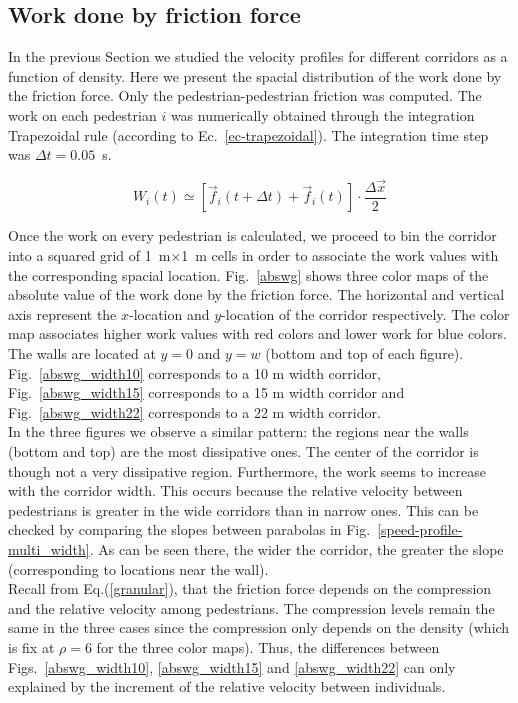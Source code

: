\subsection{Work done by friction force}

In the previous Section we studied the velocity profiles for different corridors as a function of density. Here we present the spacial distribution of the work done by the friction force. Only the pedestrian-pedestrian friction was computed.
{ \color{red} The work on each pedestrian $i$ was numerically obtained through the integration Trapezoidal rule (according to Ec.~\ref{ec-trapezoidal}). The integration time step was $\Delta t = 0.05$~s}. 

\begin{equation}
W_i(t) \simeq \left [ \vec{f}_i(t+\Delta t) + \vec{f}_i(t)  \right ]\cdot \frac{\Delta \vec{x}}{2} \label{ec-trapezoidal}
\end{equation}

Once the work on every pedestrian is calculated, we proceed to bin the corridor into a squared grid of 1~m$\times$1~m cells in order to associate the work values with the corresponding spacial location. Fig.~\ref{abswg} shows three color maps of the absolute value of the work done by the friction force. The horizontal and vertical axis represent the $x$-location and $y$-location of the corridor respectively. The color map associates higher work values with red colors and lower work for blue colors. The walls are located at $y=0$ and $y=w$ (bottom and top of each figure). Fig.~\ref{abswg_width10} corresponds to a 10 m width corridor, Fig.~\ref{abswg_width15} corresponds to a 15 m width corridor and Fig.~\ref{abswg_width22} corresponds to a 22 m width corridor.\\

In the three figures we observe a similar pattern: the regions near the walls (bottom and top) are the most dissipative ones. The center of the corridor is though not a very dissipative region. Furthermore, the work seems to increase with the corridor width. This occurs because the relative velocity between pedestrians is greater in the wide corridors than in narrow ones. This can be checked by comparing the slopes between parabolas in Fig.~\ref{speed-profile-multi_width}. As can be seen there, the wider the corridor, the greater the slope (corresponding to locations near the wall).\\

Recall from Eq.(\ref{granular}), that the friction force depends on the compression and the relative velocity among pedestrians. The compression levels remain the same in the three cases since the compression only depends on the density (which is fix at $\rho=6$ for the three color maps). Thus, the differences between Figs.~\ref{abswg_width10}, \ref{abswg_width15} and \ref{abswg_width22} can only explained by the increment of the relative velocity between individuals. \\

